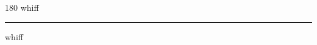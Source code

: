 
\begin{frame}
\begin{center}
\begin{turn}{180}
{\fontsize{2.5cm}{1em}\selectfont whiff}
\end{turn}
\vspace{1em}\par  
\hrule
\vspace{1em}\par  
{\fontsize{2.5cm}{1em}\selectfont whiff}
\end{center}
\end{frame}
